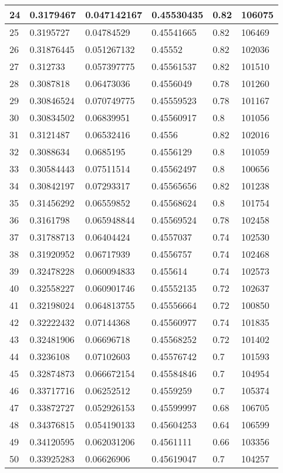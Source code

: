 \begin{longtable}{|l|l|l|l|l|l|}
24 & 0.3179467 & 0.047142167 & 0.45530435 & 0.82 & 106075 \\ \hline 
25 & 0.3195727 & 0.04784529 & 0.45541665 & 0.82 & 106469 \\ \hline 
26 & 0.31876445 & 0.051267132 & 0.45552 & 0.82 & 102036 \\ \hline 
27 & 0.312733 & 0.057397775 & 0.45561537 & 0.82 & 101510 \\ \hline 
28 & 0.3087818 & 0.06473036 & 0.4556049 & 0.78 & 101260 \\ \hline 
29 & 0.30846524 & 0.070749775 & 0.45559523 & 0.78 & 101167 \\ \hline 
30 & 0.30834502 & 0.06839951 & 0.45560917 & 0.8 & 101056 \\ \hline 
31 & 0.3121487 & 0.06532416 & 0.4556 & 0.82 & 102016 \\ \hline 
32 & 0.3088634 & 0.0685195 & 0.4556129 & 0.8 & 101059 \\ \hline 
33 & 0.30584443 & 0.07511514 & 0.45562497 & 0.8 & 100656 \\ \hline 
34 & 0.30842197 & 0.07293317 & 0.45565656 & 0.82 & 101238 \\ \hline 
35 & 0.31456292 & 0.06559852 & 0.45568624 & 0.8 & 101754 \\ \hline 
36 & 0.3161798 & 0.065948844 & 0.45569524 & 0.78 & 102458 \\ \hline 
37 & 0.31788713 & 0.06404424 & 0.4557037 & 0.74 & 102530 \\ \hline 
38 & 0.31920952 & 0.06717939 & 0.4556757 & 0.74 & 102468 \\ \hline 
39 & 0.32478228 & 0.060094833 & 0.455614 & 0.74 & 102573 \\ \hline 
40 & 0.32558227 & 0.060901746 & 0.45552135 & 0.72 & 102637 \\ \hline 
41 & 0.32198024 & 0.064813755 & 0.45556664 & 0.72 & 100850 \\ \hline 
42 & 0.32222432 & 0.07144368 & 0.45560977 & 0.74 & 101835 \\ \hline 
43 & 0.32481906 & 0.06696718 & 0.45568252 & 0.72 & 101402 \\ \hline 
44 & 0.3236108 & 0.07102603 & 0.45576742 & 0.7 & 101593 \\ \hline 
45 & 0.32874873 & 0.066672154 & 0.45584846 & 0.7 & 104954 \\ \hline 
46 & 0.33717716 & 0.06252512 & 0.4559259 & 0.7 & 105374 \\ \hline 
47 & 0.33872727 & 0.052926153 & 0.45599997 & 0.68 & 106705 \\ \hline 
48 & 0.34376815 & 0.054190133 & 0.45604253 & 0.64 & 106599 \\ \hline 
49 & 0.34120595 & 0.062031206 & 0.4561111 & 0.66 & 103356 \\ \hline 
50 & 0.33925283 & 0.06626906 & 0.45619047 & 0.7 & 104257 \\ \hline 
\end{longtable}